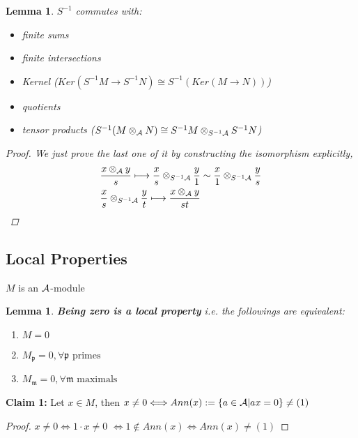 \documentclass[11pt]{article}
\newtheorem{lemma}[thm]{Lemma}
\newcommand{\scm}{{\mathfrak m}}
\newcommand{\scp}{{\mathfrak p}}
\newcommand{\cala}{{\cal A}}
\newcommand{\lrta}{\longrightarrow}
\newcommand{\Llrta}{\Longleftrightarrow}
\begin{document}
\begin{lemma}
$S^{-1} $ commutes with:
\begin{itemize}
\item finite sums 
\item finite intersections
\item Kernel ($Ker(S^{-1}M\lrta S^{-1}N)\cong S^{-1}(Ker(M\lrta N))$)
\item quotients 
\item tensor products ($S^{-1}(M\otimes_\cala N)\cong S^{-1} M\otimes_{S^{-1}\cala}S^{-1}N$)
\end{itemize} 
\begin{proof}
We just prove the last one of it by constructing the isomorphism explicitly,
$$
\begin{aligned}
&\frac{x\otimes_\cala y}{s}\longmapsto \frac{x}{s}\otimes_{S^{-1}\cala}\frac{y}{1}\sim \frac{x}{1}\otimes_{S^{-1}\cala}\frac{y}{s}\\
&\frac{x}{s}\otimes_{S^{-1}\cala}\frac{y}{t}\longmapsto \frac{x\otimes_\cala y}{s t} 
\end{aligned}
$$
\end{proof}
\end{lemma}

\subsection*{Local Properties}
$M$ is an $\cala$-module
\begin{lemma}\label{lem:zerpo_local}
\textbf{Being zero is a local property} i.e. the followings are equivalent:
\begin{enumerate}[label=(\alph*)]
\item $M=0$
\item $M_\scp=0,\forall \scp \text{ primes }$
\item $M_\scm=0,\forall \scm \text{ maximals}$
\end{enumerate}
\end{lemma}
\noindent\textbf{Claim 1:}
Let $x\in M$, then $x\neq 0\Longleftrightarrow Ann(x):=\{a\in\cala|ax=0\}\neq (1)$
\begin{proof}
$x\neq 0\Llrta 1\cdot x\neq 0$ $\Llrta 1\notin Ann(x)\Llrta Ann(x)\neq (1)$
\end{proof}
\end{document}
